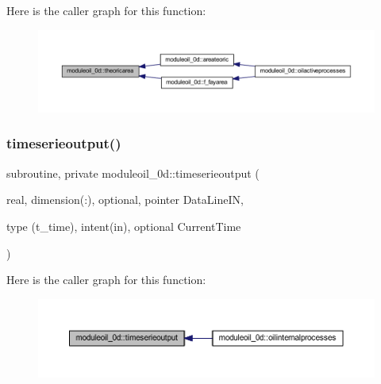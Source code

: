 Here is the caller graph for this function\+:\nopagebreak
\begin{figure}[H]
\begin{center}
\leavevmode
\includegraphics[width=350pt]{namespacemoduleoil__0d_a45de73afad09d7f9580070bd1ef770e5_icgraph}
\end{center}
\end{figure}
\mbox{\label{namespacemoduleoil__0d_adc57618d972ed75f50dada4e81e80be6}} 
\subsubsection{\texorpdfstring{timeserieoutput()}{timeserieoutput()}}
{\footnotesize\ttfamily subroutine, private moduleoil\+\_\+0d\+::timeserieoutput (\begin{DoxyParamCaption}\item[{real, dimension(\+:), optional, pointer}]{Data\+Line\+IN,  }\item[{type (t\+\_\+time), intent(in), optional}]{Current\+Time }\end{DoxyParamCaption})\hspace{0.3cm}{\ttfamily [private]}}

Here is the caller graph for this function\+:\nopagebreak
\begin{figure}[H]
\begin{center}
\leavevmode
\includegraphics[width=350pt]{namespacemoduleoil__0d_adc57618d972ed75f50dada4e81e80be6_icgraph}
\end{center}
\end{figure}
\mbox{\label{namespacemoduleoil__0d_a5e491438effacee8f245a2f293ac1cd5}} 
